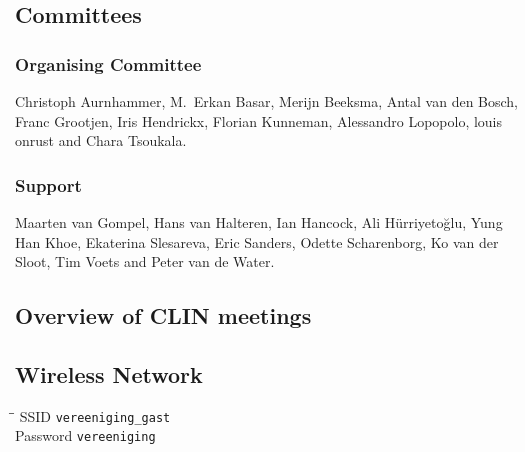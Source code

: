 \subsection*{Committees}


\subsubsection*{Organising Committee}
Christoph Aurnhammer, M.~Erkan Basar, Merijn Beeksma, Antal van den Bosch, Franc Grootjen, Iris Hendrickx, Florian Kunneman, Alessandro Lopopolo, louis onrust and Chara Tsoukala.

\subsubsection*{Support}
Maarten van Gompel, Hans van Halteren, Ian Hancock, Ali Hürriyetoğlu, Yung Han Khoe, Ekaterina Slesareva, Eric Sanders, Odette Scharenborg, Ko van der Sloot, Tim Voets and Peter van de Water.


\subsection*{Overview of CLIN meetings}

\subsection*{Wireless Network}
\begin{tabbing}
\phantom{Password } \=  \= \kill %
SSID     \> \texttt{vereeniging\_gast} \\
Password \> \texttt{vereeniging} \\
\end{tabbing}


